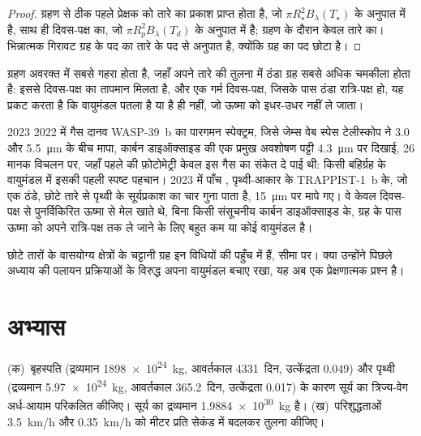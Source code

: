 \begin{proof}
ग्रहण से ठीक पहले प्रेक्षक को तारे का प्रकाश प्राप्त होता है, जो $\pi R_\star^2 B_\lambda(T_\star)$
के अनुपात में है, साथ ही दिवस-पक्ष का, जो $\pi R_p^2 B_\lambda(T_d)$
के अनुपात में है; ग्रहण के दौरान केवल तारे का।
भिन्नात्मक गिरावट ग्रह के पद का तारे के पद से अनुपात है,
क्योंकि ग्रह का पद छोटा है।
\end{proof}

ग्रहण अवरक्त में सबसे गहरा होता है, जहाँ अपने तारे की तुलना में ठंडा ग्रह सबसे अधिक चमकीला होता है:
इससे दिवस-पक्ष का तापमान मिलता है, और एक गर्म दिवस-पक्ष, जिसके पास ठंडा रात्रि-पक्ष हो,
यह प्रकट करता है कि वायुमंडल पतला है या है ही नहीं,
जो ऊष्मा को इधर-उधर नहीं ले जाता।

\begin{dated}{2023}
2022 में गैस दानव WASP-39~b का पारगमन स्पेक्ट्रम,
जिसे जेम्स वेब स्पेस टेलीस्कोप ने 3.0 और \qty{5.5}{\micro m} के बीच मापा,
कार्बन डाइऑक्साइड की एक प्रमुख अवशोषण पट्टी
\qty{4.3}{\micro m} पर दिखाई, 26 मानक विचलन पर, जहाँ पहले की फ़ोटोमेट्री
केवल इस गैस का संकेत दे पाई थी: किसी बहिर्ग्रह के वायुमंडल में इसकी पहली स्पष्ट पहचान।
2023 में पाँच , पृथ्वी-आकार के TRAPPIST-1~b के,
जो एक ठंडे, छोटे तारे से पृथ्वी के सूर्यप्रकाश का चार गुना पाता है,
\qty{15}{\micro m} पर मापे गए। वे
केवल दिवस-पक्ष से पुनर्विकिरित ऊष्मा से मेल खाते थे, बिना किसी
संसूचनीय कार्बन डाइऑक्साइड के, ग्रह के पास ऊष्मा को अपने रात्रि-पक्ष तक ले जाने के लिए
बहुत कम या कोई वायुमंडल है।
\end{dated}

छोटे तारों के वासयोग्य क्षेत्रों के चट्टानी ग्रह
इन विधियों की पहुँच में हैं, सीमा पर। क्या उन्होंने पिछले अध्याय की
पलायन प्रक्रियाओं के विरुद्ध अपना वायुमंडल बचाए रखा, यह अब एक
प्रेक्षणात्मक प्रश्न है।

\section{अभ्यास}

\begin{exercise}[$\star$]\label{exo:b3:exoplanets:1}
(क)~बृहस्पति (द्रव्यमान \qty{1898e24}{kg}, आवर्तकाल \num{4331}~दिन,
उत्केंद्रता 0.049) और पृथ्वी (द्रव्यमान \qty{5.97e24}{kg}, आवर्तकाल
\num{365.2}~दिन, उत्केंद्रता 0.017) के कारण सूर्य का त्रिज्य-वेग अर्ध-आयाम
परिकलित कीजिए। सूर्य का द्रव्यमान \qty{1.9884e30}{kg} है।
(ख)~परिशुद्धताओं \qty{3.5}{km/h} और \qty{0.35}{km/h} को
मीटर प्रति सेकंड में बदलकर तुलना कीजिए।
\end{exercise}

